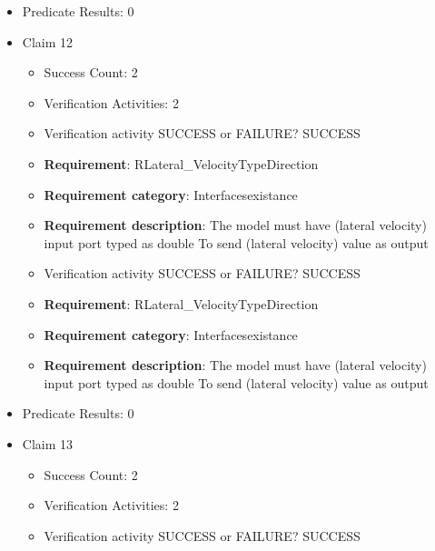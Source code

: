 \documentclass{article}
\begin{document}
\begin{itemize}
\begin{itemize}
					\item Verification activity SUCCESS or FAILURE? SUCCESS
		
						\item \textbf{Requirement}: RLongitudinal\_VelocityTypeDirection 
						\item \textbf{Requirement category}: Interfacesexistance 
						\item \textbf{Requirement description}: The model must have (longitudinal velocity) input port typed as double To send (longitudinal velocity) value as output
					
				\end{itemize}
				
									    
				\item Predicate Results: 0

  				  \item Claim 12
				\begin{itemize}
			    	\item Success Count: 2 
			    	\item Verification Activities: 2
					\item Verification activity SUCCESS or FAILURE? SUCCESS
		
						\item \textbf{Requirement}: RLateral\_VelocityTypeDirection 
						\item \textbf{Requirement category}: Interfacesexistance 
						\item \textbf{Requirement description}: The model must have (lateral velocity) input port typed as double To send (lateral velocity) value as output
					
					\item Verification activity SUCCESS or FAILURE? SUCCESS
		
						\item \textbf{Requirement}: RLateral\_VelocityTypeDirection 
						\item \textbf{Requirement category}: Interfacesexistance 
						\item \textbf{Requirement description}: The model must have (lateral velocity) input port typed as double To send (lateral velocity) value as output
					
				\end{itemize}
				
									    
				\item Predicate Results: 0

  				  \item Claim 13
				\begin{itemize}
			    	\item Success Count: 2 
			    	\item Verification Activities: 2
					\item Verification activity SUCCESS or FAILURE? SUCCESS
		

\end{itemize}
\end{itemize}
\end{document}
